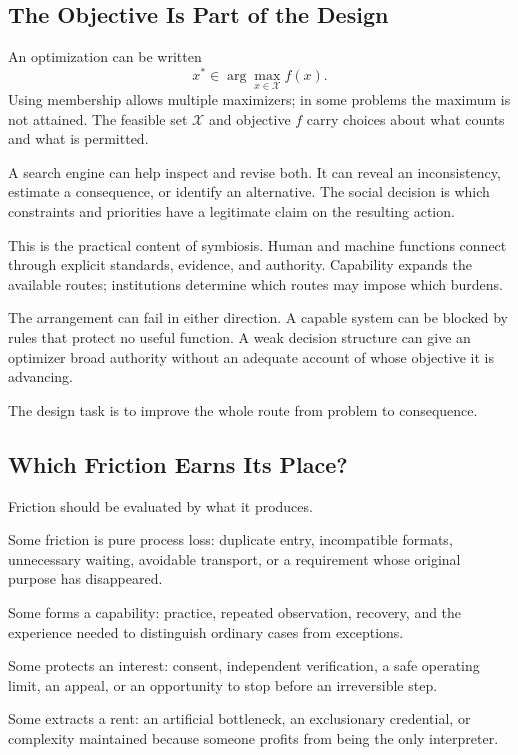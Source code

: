 \subsection{The Objective Is Part of the Design}

An optimization can be written
\begin{equation}
 x^\ast\in\arg\max_{x\in\mathcal X} f(x).
\end{equation}
Using membership allows multiple maximizers; in some problems the maximum is not attained. The feasible set $\mathcal X$ and objective $f$ carry choices about what counts and what is permitted.

A search engine can help inspect and revise both. It can reveal an inconsistency, estimate a consequence, or identify an alternative. The social decision is which constraints and priorities have a legitimate claim on the resulting action.

This is the practical content of symbiosis. Human and machine functions connect through explicit standards, evidence, and authority. Capability expands the available routes; institutions determine which routes may impose which burdens.

The arrangement can fail in either direction. A capable system can be blocked by rules that protect no useful function. A weak decision structure can give an optimizer broad authority without an adequate account of whose objective it is advancing.

The design task is to improve the whole route from problem to consequence.

\subsection{Which Friction Earns Its Place?}

Friction should be evaluated by what it produces.

Some friction is pure process loss: duplicate entry, incompatible formats, unnecessary waiting, avoidable transport, or a requirement whose original purpose has disappeared.

Some forms a capability: practice, repeated observation, recovery, and the experience needed to distinguish ordinary cases from exceptions.

Some protects an interest: consent, independent verification, a safe operating limit, an appeal, or an opportunity to stop before an irreversible step.

Some extracts a rent: an artificial bottleneck, an exclusionary credential, or complexity maintained because someone profits from being the only interpreter.

